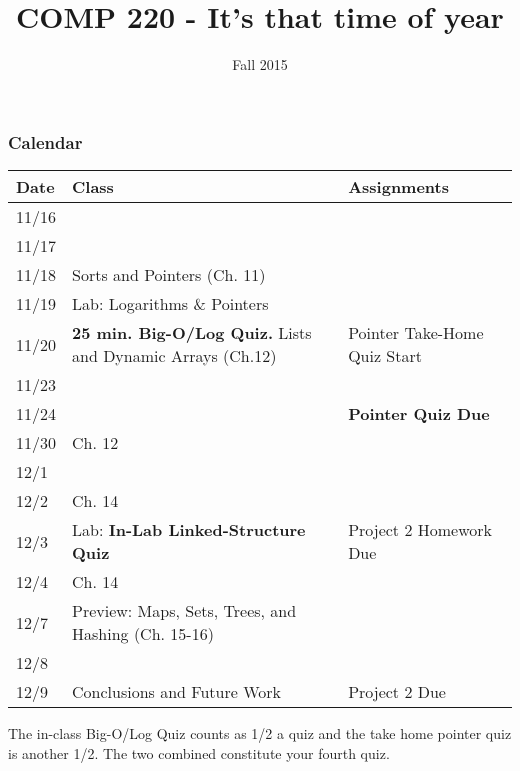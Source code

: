 \documentclass[10pt]{article}
\title{COMP 220 - It's that time of year}
\author{  }
\date{Fall 2015}
\begin{document}
\maketitle
\thispagestyle{empty}

\subsubsection*{Calendar}

\begin{center}
\begin{tabular}{lll}
Date & Class & Assignments \\ \hline \hline
11/16 & &\\
11/17 & &\\
11/18 & Sorts and Pointers (Ch. 11) &\\
11/19 & Lab: Logarithms \& Pointers &\\ 
11/20 & \textbf{25 min. Big-O/Log Quiz.} Lists and Dynamic Arrays (Ch.12) & Pointer Take-Home Quiz Start \\ \hline
11/23 & & \\
11/24 & &\textbf{Pointer Quiz Due} \\ \hline
11/30 & Ch. 12  & \\
12/1 & & \\ 	
12/2 & Ch. 14 & \\
12/3 & Lab: \textbf{In-Lab Linked-Structure Quiz} & Project 2 Homework Due \\
12/4 & Ch. 14 & \\ \hline
12/7 & Preview: Maps, Sets, Trees, and Hashing (Ch. 15-16) & \\
12/8 & & \\
12/9 & Conclusions and Future Work & Project 2 Due
\end{tabular}
\end{center}

The in-class Big-O/Log Quiz counts as 1/2 a quiz and the take home pointer quiz is another 1/2.  The two combined constitute your fourth quiz.
\end{document}
